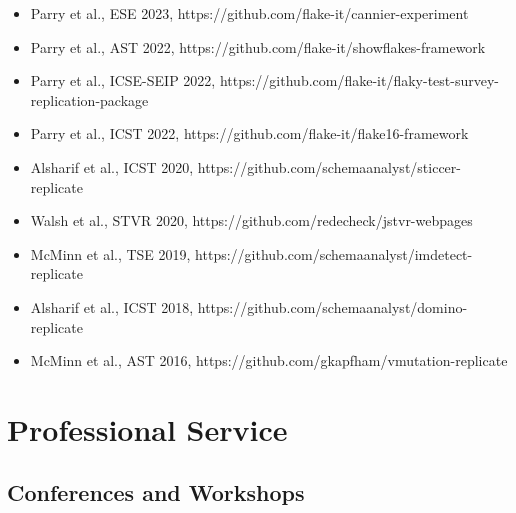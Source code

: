 \documentclass[11pt,letterpaper,sans]{moderncv}
\begin{document}
\begin{itemize} \renewcommand\labelitemi{\Large\textbullet}

  \setlength\itemsep{0.5em}

  \item Parry et al., ESE 2023, https://github.com/flake-it/cannier-experiment

  \item Parry et al., AST 2022, https://github.com/flake-it/showflakes-framework

  \item Parry et al., ICSE-SEIP 2022, https://github.com/flake-it/flaky-test-survey-replication-package

  \item Parry et al., ICST 2022, https://github.com/flake-it/flake16-framework

  \item Alsharif et al., ICST 2020, https://github.com/schemaanalyst/sticcer-replicate

  \item Walsh et al., STVR 2020, https://github.com/redecheck/jstvr-webpages

  \item McMinn et al., TSE 2019, https://github.com/schemaanalyst/imdetect-replicate

  \item Alsharif et al., ICST 2018, https://github.com/schemaanalyst/domino-replicate

  \item McMinn et al., AST 2016, https://github.com/gkapfham/vmutation-replicate

\end{itemize}

%
\vspace*{-.10in}
%
\section{Professional Service}

%
\vspace*{-.10in}
%
\subsection{{Conferences and Workshops}}

\end{document}
